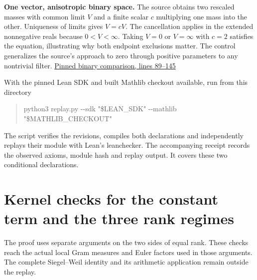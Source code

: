 \documentclass[11pt,letterpaper]{article}
\begin{document}
\textbf{One vector, anisotropic binary space.} The source obtains two rescaled masses with common limit \(V\) and a finite scalar \(c\) multiplying one mass into the other. Uniqueness of limits gives \(V=cV\). The cancellation applies in the extended nonnegative reals because \(0<V<\infty\). Taking \(V=0\) or \(V=\infty\) with \(c=2\) satisfies the equation, illustrating why both endpoint exclusions matter. The control generalizes the source's approach to zero through positive parameters to any nontrivial filter. \href{https://github.com/nousentllc/riemann-hypothesis/blob/40e56bab026552e089d7afcfeff08d2defb9c005/src/Development/AutomorphicSpectrum/Proofs/BlockDecomposition/CountingFormula.lean\#L89-L145}{Pinned binary comparison, lines 89–145}

With the pinned Lean SDK and built Mathlib checkout available, run from this directory

\begin{quote}\raggedright\setlength{\parskip}{1pt}
{\ttfamily\small python3 replay.\allowbreak{}py -\allowbreak{}-\allowbreak{}sdk "\$LEAN\_\allowbreak{}SDK" -\allowbreak{}-\allowbreak{}mathlib "\$MATHLIB\_\allowbreak{}CHECKOUT"}\par
\end{quote}
The script verifies the revisions, compiles both declarations and independently replays their module with Lean's {\ttfamily\small leanchecker}. The accompanying receipt records the observed axioms, module hash and replay output. It covers these two conditional declarations.

\clearpage\section{Kernel checks for the constant term and the three rank regimes}
The proof uses separate arguments on the two sides of equal rank. These checks reach the actual local Gram measures and Euler factors used in those arguments. The complete Siegel–Weil identity and its arithmetic application remain outside the replay.
\end{document}

